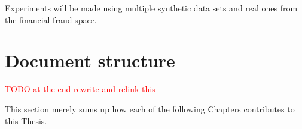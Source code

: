 Experiments will be made using multiple synthetic data sets and real ones from the financial fraud space.

\section{Document structure} 

\textcolor{red}{TODO at the end rewrite and relink this}

This section merely sums up how each of the following Chapters contributes to this Thesis.




